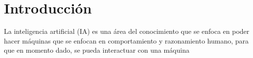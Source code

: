 \chapter{Introducción}
  La inteligencia artificial (IA) es una área del conocimiento que se enfoca en poder hacer máquinas que se enfocan en comportamiento y razonamiento humano, para que en momento dado, se pueda interactuar con una máquina 






